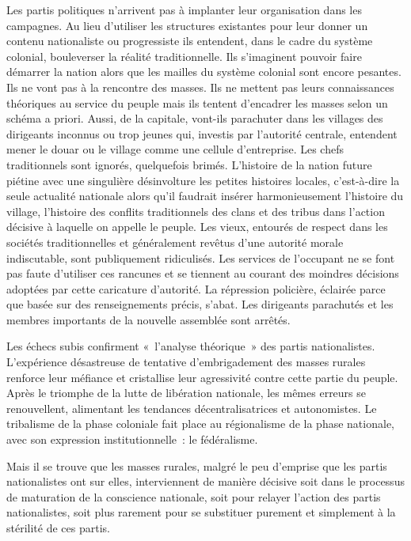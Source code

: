 \documentclass[french,twoside]{book} %
\begin{document}
\bigbreak
\noindent Les partis politiques n’arrivent pas à implanter leur organisation dans les campagnes. Au lieu d’utiliser les structures existantes   pour leur donner un contenu nationaliste ou progressiste ils entendent, dans le cadre du système colonial, bouleverser la réalité traditionnelle. Ils s’imaginent pouvoir faire démarrer la nation alors que les mailles du système colonial sont encore pesantes. Ils ne vont pas à la rencontre des masses. Ils ne mettent pas leurs connaissances théoriques au service du peuple mais ils tentent d’encadrer les masses selon un schéma a priori. Aussi, de la capitale, vont-ils parachuter dans les villages des dirigeants inconnus ou trop jeunes qui, investis par l’autorité centrale, entendent mener le douar ou le village comme une cellule d’entreprise. Les chefs traditionnels sont ignorés, quelquefois brimés. L’histoire de la nation future piétine avec une singulière désinvolture les petites histoires locales, c’est-à-dire la seule actualité nationale alors qu’il faudrait insérer harmonieusement l’histoire du village, l’histoire des conflits traditionnels des clans et des tribus dans l’action décisive à laquelle on appelle le peuple. Les vieux, entourés de respect dans les sociétés traditionnelles et généralement revêtus d’une autorité morale indiscutable, sont publiquement ridiculisés. Les services de l’occupant ne se font pas faute d’utiliser ces rancunes et se tiennent au courant des moindres décisions adoptées par cette caricature d’autorité. La répression policière, éclairée parce que basée sur des renseignements précis, s’abat. Les dirigeants parachutés et les membres importants de la nouvelle assemblée sont arrêtés.\par
Les échecs subis confirment « l’analyse théorique » des partis nationalistes. L’expérience désastreuse de tentative d’embrigadement des masses rurales renforce leur méfiance et cristallise leur agressivité contre cette partie du peuple. Après le triomphe de la lutte de libération nationale, les mêmes erreurs se renouvellent, alimentant les tendances décentralisatrices et autonomistes. Le tribalisme de la phase coloniale fait place au régionalisme de la phase nationale, avec son expression institutionnelle : le fédéralisme.\par
\bigbreak
\noindent Mais il se trouve que les masses rurales, malgré le peu d’emprise que les partis nationalistes ont sur elles, interviennent de   manière décisive soit dans le processus de maturation de la conscience nationale, soit pour relayer l’action des partis nationalistes, soit plus rarement pour se substituer purement et simplement à la stérilité de ces partis.\par
\end{document}
